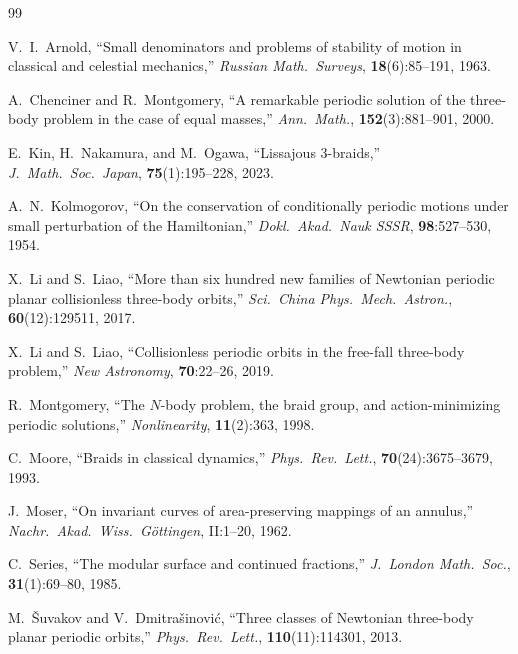 \documentclass[11pt]{article}
\theoremstyle{definition}
\begin{document}
\begin{thebibliography}{99}

V.~I.~Arnold,
``Small denominators and problems of stability of motion in
classical and celestial mechanics,''
\emph{Russian Math.\ Surveys}, \textbf{18}(6):85--191, 1963.

A.~Chenciner and R.~Montgomery,
``A remarkable periodic solution of the three-body problem in the
case of equal masses,''
\emph{Ann.\ Math.}, \textbf{152}(3):881--901, 2000.

E.~Kin, H.~Nakamura, and M.~Ogawa,
``Lissajous 3-braids,''
\emph{J.\ Math.\ Soc.\ Japan}, \textbf{75}(1):195--228, 2023.

A.~N.~Kolmogorov,
``On the conservation of conditionally periodic motions under small
perturbation of the Hamiltonian,''
\emph{Dokl.\ Akad.\ Nauk SSSR}, \textbf{98}:527--530, 1954.

X.~Li and S.~Liao,
``More than six hundred new families of Newtonian periodic planar
collisionless three-body orbits,''
\emph{Sci.\ China Phys.\ Mech.\ Astron.},
\textbf{60}(12):129511, 2017.

X.~Li and S.~Liao,
``Collisionless periodic orbits in the free-fall three-body
problem,''
\emph{New Astronomy}, \textbf{70}:22--26, 2019.

R.~Montgomery,
``The $N$-body problem, the braid group, and action-minimizing
periodic solutions,''
\emph{Nonlinearity}, \textbf{11}(2):363, 1998.

C.~Moore,
``Braids in classical dynamics,''
\emph{Phys.\ Rev.\ Lett.}, \textbf{70}(24):3675--3679, 1993.

J.~Moser,
``On invariant curves of area-preserving mappings of an annulus,''
\emph{Nachr.\ Akad.\ Wiss.\ G\"ottingen}, II:1--20, 1962.

C.~Series,
``The modular surface and continued fractions,''
\emph{J.\ London Math.\ Soc.}, \textbf{31}(1):69--80, 1985.

M.~\v{S}uvakov and V.~Dmitra\v{s}inovi\'{c},
``Three classes of Newtonian three-body planar periodic orbits,''
\emph{Phys.\ Rev.\ Lett.}, \textbf{110}(11):114301, 2013.

\end{thebibliography}

\appendix
\end{document}
